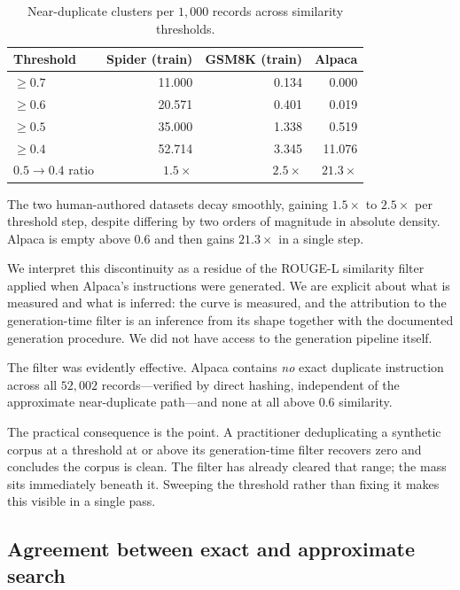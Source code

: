 \documentclass[11pt]{article}
\begin{document}
\begin{table}[h]
\centering
\small
\begin{tabular}{lrrr}
\toprule
Threshold & Spider (train) & GSM8K (train) & Alpaca \\
\midrule
$\geq 0.7$ & 11.000 & 0.134 & 0.000 \\
$\geq 0.6$ & 20.571 & 0.401 & 0.019 \\
$\geq 0.5$ & 35.000 & 1.338 & 0.519 \\
$\geq 0.4$ & 52.714 & 3.345 & 11.076 \\
\midrule
$0.5 \to 0.4$ ratio & $1.5\times$ & $2.5\times$ & $\mathbf{21.3\times}$ \\
\bottomrule
\end{tabular}
\caption{Near-duplicate clusters per $1{,}000$ records across similarity
thresholds.}
\label{tab:curve}
\end{table}

The two human-authored datasets decay smoothly, gaining $1.5\times$ to
$2.5\times$ per threshold step, despite differing by two orders of magnitude in
absolute density. Alpaca is empty above $0.6$ and then gains $21.3\times$ in a
single step.

We interpret this discontinuity as a residue of the ROUGE-L similarity filter
applied when Alpaca's instructions were generated. We are explicit about what
is measured and what is inferred: the curve is measured, and the attribution to
the generation-time filter is an inference from its shape together with the
documented generation procedure. We did not have access to the generation
pipeline itself.

The filter was evidently effective. Alpaca contains \emph{no} exact duplicate
instruction across all $52{,}002$ records---verified by direct hashing,
independent of the approximate near-duplicate path---and none at all above
$0.6$ similarity.

The practical consequence is the point. A practitioner deduplicating a
synthetic corpus at a threshold at or above its generation-time filter recovers
zero and concludes the corpus is clean. The filter has already cleared that
range; the mass sits immediately beneath it. Sweeping the threshold rather than
fixing it makes this visible in a single pass.

\subsection{Agreement between exact and approximate search}
\end{document}
